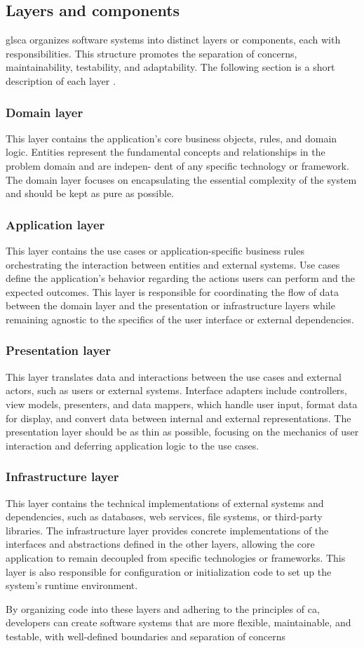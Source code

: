 \subsection{Layers and components} \label{subsec_layers}

gls{ca} organizes software systems into distinct layers or components, each with
responsibilities. This structure promotes the separation of concerns, maintainability,
testability, and adaptability. The following section is a short description of each layer
\parencite{robert_c_martin_clean_2018}.

\subsubsection{Domain layer}
This layer contains the application's core business objects, rules, and domain logic. Entities
represent the fundamental concepts and relationships in the problem domain and are indepen-
dent of any specific technology or framework. The domain layer focuses on encapsulating the
essential complexity of the system and should be kept as pure as possible.

\subsubsection{Application layer}
This layer contains the use cases or application-specific business rules orchestrating the
interaction between entities and external systems. Use cases define the application's
behavior regarding the actions users can perform and the expected outcomes. This layer is
responsible for coordinating the flow of data between the domain layer and the
presentation or infrastructure layers while remaining agnostic to the specifics of the
user interface or external dependencies.

\subsubsection{Presentation layer}
This layer translates data and interactions between the use cases and external actors,
such as users or external systems. Interface adapters include controllers, view models,
presenters, and data mappers, which handle user input, format data for display, and
convert data between internal and external representations. The presentation layer should
be as thin as possible, focusing on the mechanics of user interaction and deferring
application logic to the use cases.

\subsubsection{Infrastructure layer}
This layer contains the technical implementations of external systems and dependencies,
such as databases, web services, file systems, or third-party libraries. The
infrastructure layer provides concrete implementations of the interfaces and abstractions
defined in the other layers, allowing the core application to remain decoupled from
specific technologies or frameworks. This layer is also responsible for configuration or
initialization code to set up the system's runtime environment.

By organizing code into these layers and adhering to the principles of \gls{ca},
developers can create software systems that are more flexible, maintainable, and testable,
with well-defined boundaries and separation of concerns